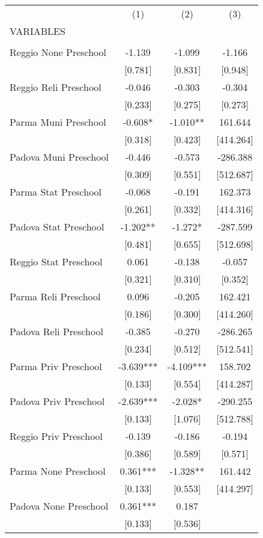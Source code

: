 \begin{tabular}{lccc} \hline
 & (1) & (2) & (3) \\
VARIABLES &  &  &  \\ \hline
 &  &  &  \\
Reggio None Preschool & -1.139 & -1.099 & -1.166 \\
 & [0.781] & [0.831] & [0.948] \\
Reggio Reli Preschool & -0.046 & -0.303 & -0.304 \\
 & [0.233] & [0.275] & [0.273] \\
Parma Muni Preschool & -0.608* & -1.010** & 161.644 \\
 & [0.318] & [0.423] & [414.264] \\
Padova Muni Preschool & -0.446 & -0.573 & -286.388 \\
 & [0.309] & [0.551] & [512.687] \\
Parma Stat Preschool & -0.068 & -0.191 & 162.373 \\
 & [0.261] & [0.332] & [414.316] \\
Padova Stat Preschool & -1.202** & -1.272* & -287.599 \\
 & [0.481] & [0.655] & [512.698] \\
Reggio Stat Preschool & 0.061 & -0.138 & -0.057 \\
 & [0.321] & [0.310] & [0.352] \\
Parma Reli Preschool & 0.096 & -0.205 & 162.421 \\
 & [0.186] & [0.300] & [414.260] \\
Padova Reli Preschool & -0.385 & -0.270 & -286.265 \\
 & [0.234] & [0.512] & [512.541] \\
Parma Priv Preschool & -3.639*** & -4.109*** & 158.702 \\
 & [0.133] & [0.554] & [414.287] \\
Padova Priv Preschool & -2.639*** & -2.028* & -290.255 \\
 & [0.133] & [1.076] & [512.788] \\
Reggio Priv Preschool & -0.139 & -0.186 & -0.194 \\
 & [0.386] & [0.589] & [0.571] \\
Parma None Preschool & 0.361*** & -1.328** & 161.442 \\
 & [0.133] & [0.553] & [414.297] \\
Padova None Preschool & 0.361*** & 0.187 &  \\
 & [0.133] & [0.536] &  \\

\end{tabular}
